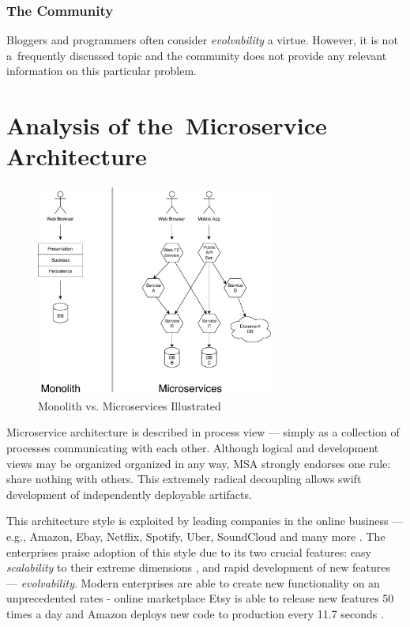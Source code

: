 \documentclass[thesis=M,english,hidelinks]{FITthesis}[2012/10/20]
\begin{document}
\subsection{The Community}
Bloggers and programmers often consider \textit{evolvability} a virtue. However, it is not a~frequently discussed topic and the community does not provide any relevant information on this particular problem.

% 
% 
\chapter{Analysis of the~Microservice Architecture}
\label{sec:msa_analysis}

% 
% 
\begin{figure}[b]
  \centering
    \includegraphics[width=0.7\textwidth]{images/monolith_vs_microservice.pdf}
    \caption{Monolith vs. Microservices Illustrated}
    \label{fig:monolith_vs_microservices}
\end{figure}

Microservice architecture is described in process view --- simply as a collection of processes communicating with each other. Although logical and development views may be organized organized in any way, \acrshort{MSA} strongly endorses one rule: share nothing with others. This extremely radical decoupling allows swift development of independently deployable artifacts.

This architecture style is exploited by leading companies in the online business --- e.g., Amazon, Ebay, Netflix, Spotify, Uber, SoundCloud and many more \cite{ms-who-is-using}. The enterprises praise adoption of this style due to its two crucial features: easy \textit{scalability} to their extreme dimensions \cite{ms-ebay-scalability-best-practices, ms-ebay-ds-scalability, ms-spotify-horizontal-scaling, ms-spotify}, and rapid development of new features --- \textit{evolvability}. Modern enterprises are able to create new functionality on an unprecedented rates - online marketplace Etsy is able to release new features 50 times a day and Amazon deploys new code to production every 11.7 seconds \cite{devops-deploying-hourly}.
\end{document}
